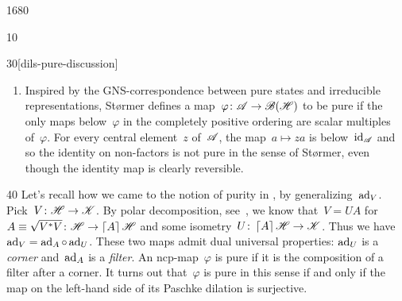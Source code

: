 \begin{parsec}{1680}
\begin{point}{10}
\begin{point}{30}[dils-pure-discussion]
\begin{enumerate}
\item
Inspired by the GNS-correspondence between pure states and
    irreducible representations,
St\o rmer defines a map~$\varphi\colon \mathscr{A} \to \mathscr{B}(\mathscr{H})$ to be pure
    if the only maps below~$\varphi$ in the completely positive ordering
    are scalar multiples of~$\varphi$.
For every central element~$z$ of~$\mathscr{A}$,
    the map~$a \mapsto za$ is below~$\mathrm{id}_{\mathscr{A}}$
    and so the identity on non-factors is not pure in the sense
        of St\o rmer,
        even though the identity map is clearly reversible.
\end{enumerate}
\end{point}
\begin{point}{40}%
Let's recall how we came to the notion of purity in ,
    by generalizing~$\mathrm{ad}_V$.
Pick~$V \colon \mathscr{H} \to \mathscr{K}$.
    By polar decomposition, see~, we know that~$V = U A$
    for~$A \equiv \sqrt{V^*V} \colon \mathscr{H} \to \left\lceil A\right\rceil \mathscr{H}$
    and some isometry~$U \colon \left\lceil A\right\rceil \mathscr{H} \to \mathscr{K}$.
Thus we have~$\mathrm{ad}_V = \mathrm{ad}_A \mathop{\circ} \mathrm{ad}_U$.
These two maps admit dual universal properties:
    $\mathrm{ad}_U$ is a \emph{corner}
    and~$\mathrm{ad}_A$ is a \emph{filter}.
An ncp-map~$\varphi$ is pure
    if it is the composition of a filter after a corner.
It turns out that~$\varphi$ is pure in this sense
    if and only if the map on the left-hand side of
    its Paschke dilation is surjective.
\end{point}
\end{point}
\end{parsec}

